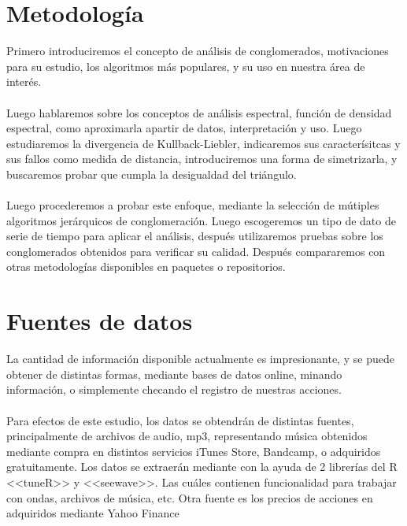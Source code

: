 \documentclass[12pt,oneside]{book}
\begin{document}
\chapter{Metodolog\'ia}
Primero introduciremos el concepto de an\'alisis de conglomerados, motivaciones para su estudio, los algoritmos m\'as populares, y su uso en nuestra \'area de inter\'es.\\\\
Luego hablaremos sobre los conceptos de an\'alisis espectral, funci\'on de densidad espectral, como aproximarla apartir de datos, interpretaci\'on y uso. Luego estudiaremos la divergencia de Kullback-Liebler, indicaremos sus caracter\'isitcas y sus fallos como medida de distancia, introduciremos una forma de simetrizarla, y buscaremos probar que cumpla la desigualdad del tri\'angulo.\\\\
Luego procederemos a probar este enfoque, mediante la selecci\'on de m\'utiples algoritmos jer\'arquicos de conglomeraci\'on. Luego escogeremos un tipo de dato de serie de tiempo para aplicar el an\'alisis, despu\'es utilizaremos pruebas sobre los conglomerados obtenidos para verificar su calidad. Despu\'es compararemos con otras metodolog\'ias disponibles en paquetes o repositorios.
\chapter{Fuentes de datos}
La cantidad de informaci\'on disponible actualmente es impresionante, y se puede obtener de distintas formas, mediante bases de datos online, minando informaci\'on, o simplemente checando el registro de nuestras acciones. \\\\

Para efectos de este estudio, los datos se obtendr\'an de distintas fuentes, principalmente de archivos de audio, mp3, representando m\'usica obtenidos mediante compra en distintos servicios iTunes Store\textcopyright, Bandcamp\textcopyright, o adquiridos gratuitamente. Los datos se extraer\'an mediante con la ayuda de 2 librer\'ias del R <<tuneR>> y <<seewave>>. Las cu\'ales contienen funcionalidad para trabajar con ondas, archivos de m\'usica, etc. Otra fuente es los precios de acciones en adquiridos mediante Yahoo Finance \textcopyright\\\\
\end{document}
